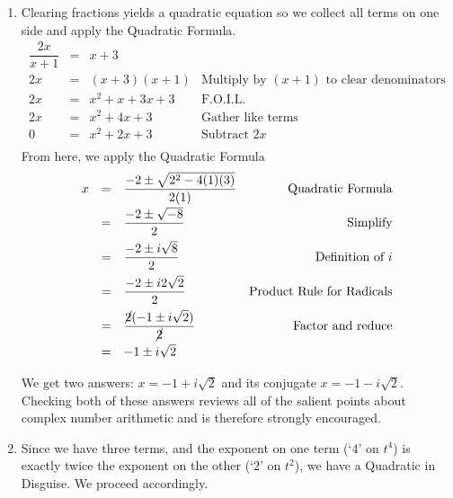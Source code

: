 {
\begin{enumerate}


\item  Clearing fractions yields a quadratic equation so we collect all terms on one side and apply the Quadratic Formula.\[ \begin{array}{rclr}


\dfrac{2x}{x+1} & = &  x+3 & \\[5pt]
2x & = & (x+3)(x+1) & \text{Multiply by $(x+1)$ to clear denominators} \\

2x & = & x^2 + x + 3x + 3 & \text{F.O.I.L.} \\

2x & = & x^2 + 4x + 3 & \text{Gather like terms} \\

0 & = & x^2 + 2x + 3 & \text{Subtract $2x$} \\

\end{array}\] From here, we apply the Quadratic Formula \[ \begin{array}{rclr}

x  & =  & \dfrac{-2 \pm \sqrt{2^2 - 4(1)(3)}}{2(1)}  & \text{Quadratic Formula}\\[8pt]
    & = &  \dfrac{-2 \pm \sqrt{-8}}{2} & \text{Simplify}\\[8pt]
		& =  & \dfrac{-2 \pm i \sqrt{8}}{2} & \text{Definition of $i$}\\[8pt]
		& =  & \dfrac{-2 \pm i 2\sqrt{2}}{2} & \text{Product Rule for Radicals}\\[8pt]
		& = & \dfrac{\cancel{2}(-1 \pm i\sqrt{2})}{\cancel{2}} & \text{Factor and reduce}\\[8pt]
		& = & -1 \pm i \sqrt{2} & \\
		\end{array} \]
		
We get two answers: $x = -1 + i\sqrt{2}$ and its conjugate $x = -1 - i\sqrt{2}$.  Checking both of these answers reviews all of the salient points about complex number arithmetic and is therefore strongly encouraged.

\item  Since we have three terms, and the exponent on one term (`$4$' on $t^4$) is exactly twice the exponent on the other (`$2$' on $t^2$), we have a Quadratic in Disguise.  We proceed accordingly.\[ \begin{array}{rclr}


\end{array}\]
\end{enumerate}}
